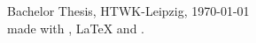 \null
\vfill
\begin{flushright}
    \textbf{\thesisAuthor}\\
    \thesisAuthorAddress\\
    \href{mailto:\thesisAuthorEmail}{\thesisAuthorEmail}\\
    \href{http://\thesisAuthorWebsite}{\thesisAuthorWebsite}\\
    \textit{\thesisTitle}\\
    Bachelor Thesis, HTWK-Leipzig, \today\\
    \vspace{12pt}
    made with \XeTeX{}, \LaTeX{} and \BibTeX{}.
\end{flushright}